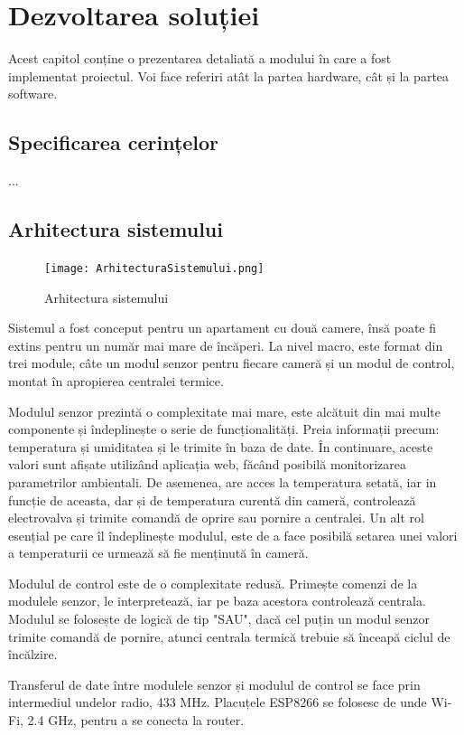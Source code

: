 \chapter{Dezvoltarea soluției}\label{ch:4dezvoltareaSolutiei}

	Acest capitol conține o prezentarea detaliată a modului în care a fost implementat proiectul. Voi face referiri atât la partea hardware, cât și la partea software. 

\section{Specificarea cerințelor}
	...

\section{Arhitectura sistemului}

\begin{figure}[H]
   	\centering
    	\texttt{[image: ArhitecturaSistemului.png]}
	\caption{Arhitectura sistemului}
\end{figure}

	Sistemul a fost conceput pentru un apartament cu două camere, însă poate fi extins pentru un număr mai mare de încăperi. La nivel macro, este format din trei module, câte un modul senzor pentru fiecare cameră și un modul de control, montat în apropierea centralei termice.

	Modulul senzor prezintă o complexitate mai mare, este alcătuit din mai multe componente și îndeplinește o serie de funcționalități. Preia informații precum: temperatura și umiditatea și le trimite în baza de date. În continuare, aceste valori sunt afișate utilizând aplicația web, făcând posibilă monitorizarea parametrilor ambientali. De asemenea, are acces la temperatura setată, iar in funcție de aceasta, dar și de temperatura curentă din cameră, controlează electrovalva și trimite comandă de oprire sau pornire a centralei. Un alt rol esențial pe care îl îndeplinește modulul, este de a face posibilă setarea unei valori a temperaturii ce urmează să fie menținută în cameră.

	Modulul de control este de o complexitate redusă. Primește comenzi de la modulele senzor, le interpretează, iar pe baza acestora controlează centrala. Modulul se folosește de logică de tip "SAU", dacă cel puțin un modul senzor trimite comandă de pornire, atunci centrala termică trebuie să înceapă ciclul de încălzire.

	Transferul de date între modulele senzor și modulul de control se face prin intermediul undelor radio, 433 MHz. Placuțele ESP8266 se folosesc de unde Wi-Fi, 2.4 GHz, pentru a se conecta la router.

